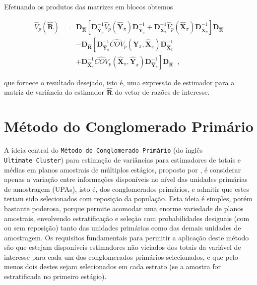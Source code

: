 \documentclass[]{book}
\theoremstyle{definition}
\theoremstyle{definition}
\theoremstyle{definition}
\theoremstyle{remark}
\begin{document}
Efetuando os produtos das matrizes em blocos obtemos

\begin{eqnarray}
\widehat{V}_{p}\left( \widehat{\mathbf{R}}\right) &=&\mathbf{\mathbf{D}_{
\widehat{\mathbf{R}}}}\left[ \mathbf{D}_{\mathbf{\hat{Y}}_{\pi }}^{-1}%
\widehat{V}_{p}\left( \mathbf{\hat{Y}}_{\pi }\right) \mathbf{D}_{\mathbf{
\hat{Y}}_{\pi }}^{-1}+\mathbf{D}_{\mathbf{\hat{X}}_{\pi }}^{-1}\widehat{V}
_{p}\left( \mathbf{\hat{X}}_{\pi }\right) \mathbf{D}_{\mathbf{\hat{X}}_{\pi
}}^{-1}\right] \mathbf{\mathbf{D}_{\widehat{\mathbf{R}}}}  \nonumber \\
&&-\mathbf{\mathbf{D}_{\widehat{\mathbf{R}}}}\left[ \mathbf{D}_{\mathbf{\hat{
Y}}_{\pi }}^{-1}\widehat{COV}_{p}\left( \mathbf{\hat{Y}}_{\pi }\mathbf{,\hat{
X}}_{\pi }\right) \mathbf{D}_{\mathbf{\hat{X}}_{\pi }}^{-1}\right.
\label{eq:estpa22} \\
&&+\left. \mathbf{D}_{\mathbf{\hat{X}}_{\pi }}^{-1}\widehat{COV}_{p}\left( 
\mathbf{\hat{X}}_{\pi }\mathbf{,\hat{Y}}_{\pi }\right) \mathbf{D}_{\mathbf{
\hat{Y}}_{\pi }}^{-1}\right] \mathbf{\mathbf{D}_{\widehat{\mathbf{R}}}}\;\;
\mbox{,}  \nonumber
\end{eqnarray}

que fornece o resultado desejado, isto é, uma expressão de estimador
para a matriz de variância do estimador \(\widehat{\mathbf{R}}\) do
vetor de razões de interesse.

\section{Método do Conglomerado
Primário}\label{metodo-do-conglomerado-primario}

A ideia central do \texttt{Método\ do\ Conglomerado\ Primário} (do
inglês \texttt{Ultimate\ Cluster}) para estimação de variâncias para
estimadores de totais e médias em planos amostrais de múltiplos
estágios, proposto por \citep{hansen}, é considerar apenas a variação
entre informações disponíveis no nível das unidades primárias de
amostragem (UPAs), isto é, dos conglomerados primários, e admitir que
estes teriam sido selecionados com reposição da população. Esta ideia é
simples, porém bastante poderosa, porque permite acomodar uma enorme
variedade de planos amostrais, envolvendo estratificação e seleção com
probabilidades desiguais (com ou sem reposição) tanto das unidades
primárias como das demais unidades de amostragem. Os requisitos
fundamentais para permitir a aplicação deste método são que estejam
disponíveis estimadores não viciados dos totais da variável de interesse
para cada um dos conglomerados primários selecionados, e que pelo menos
dois destes sejam selecionados em cada estrato (se a amostra for
estratificada no primeiro estágio).
\end{document}
